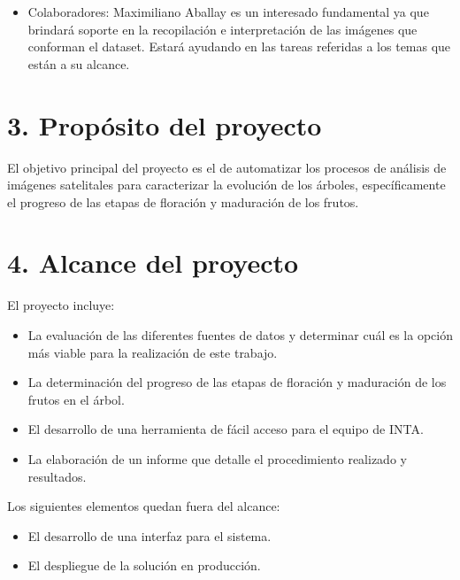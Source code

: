 \documentclass[
11pt, %
]{charter}
\begin{document}
\begin{itemize}
  \item Colaboradores: Maximiliano Aballay es un interesado fundamental ya que brindará soporte en la recopilación
  e interpretación de las imágenes que conforman el dataset. Estará ayudando en las tareas referidas a los temas que están
  a su alcance.
\end{itemize}




\section{3. Propósito del proyecto}
\label{sec:proposito}

El objetivo principal del proyecto es el de automatizar los procesos de análisis de imágenes satelitales para caracterizar
la evolución de los árboles, específicamente el progreso de las etapas de floración y maduración de los frutos.  


\section{4. Alcance del proyecto}
\label{sec:alcance}

El proyecto incluye:
\begin{itemize}
	\item La evaluación de las diferentes fuentes de datos y determinar cuál es la opción más viable para la realización de este trabajo.
	\item La determinación del progreso de las etapas de floración y maduración de los frutos en el árbol.
	\item El desarrollo de una herramienta de fácil acceso para el equipo de INTA.
	\item La elaboración de un informe que detalle el procedimiento realizado y resultados.
\end{itemize}

Los siguientes elementos quedan fuera del alcance:
\begin{itemize}
	\item El desarrollo de una interfaz para el sistema. 	
	\item El despliegue de la solución en producción.
\end{itemize}
\end{document}
